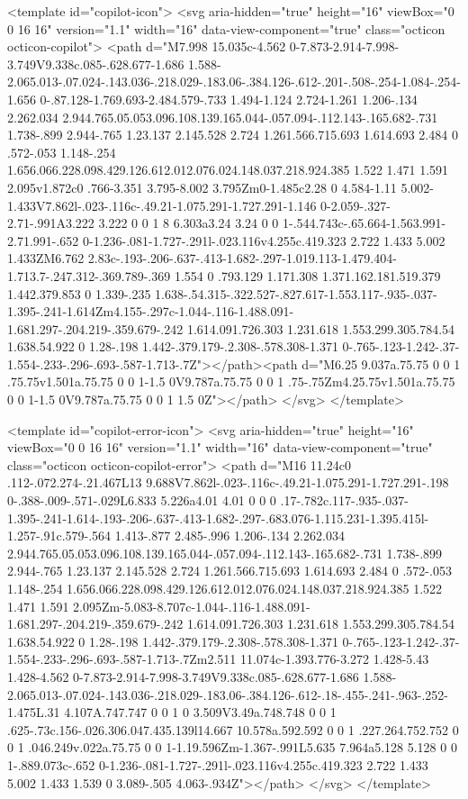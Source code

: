 <template id="copilot-icon">
  <svg aria-hidden="true" height="16" viewBox="0 0 16 16" version="1.1" width="16" data-view-component="true" class="octicon octicon-copilot">
    <path d="M7.998 15.035c-4.562 0-7.873-2.914-7.998-3.749V9.338c.085-.628.677-1.686 1.588-2.065.013-.07.024-.143.036-.218.029-.183.06-.384.126-.612-.201-.508-.254-1.084-.254-1.656 0-.87.128-1.769.693-2.484.579-.733 1.494-1.124 2.724-1.261 1.206-.134 2.262.034 2.944.765.05.053.096.108.139.165.044-.057.094-.112.143-.165.682-.731 1.738-.899 2.944-.765 1.23.137 2.145.528 2.724 1.261.566.715.693 1.614.693 2.484 0 .572-.053 1.148-.254 1.656.066.228.098.429.126.612.012.076.024.148.037.218.924.385 1.522 1.471 1.591 2.095v1.872c0 .766-3.351 3.795-8.002 3.795Zm0-1.485c2.28 0 4.584-1.11 5.002-1.433V7.862l-.023-.116c-.49.21-1.075.291-1.727.291-1.146 0-2.059-.327-2.71-.991A3.222 3.222 0 0 1 8 6.303a3.24 3.24 0 0 1-.544.743c-.65.664-1.563.991-2.71.991-.652 0-1.236-.081-1.727-.291l-.023.116v4.255c.419.323 2.722 1.433 5.002 1.433ZM6.762 2.83c-.193-.206-.637-.413-1.682-.297-1.019.113-1.479.404-1.713.7-.247.312-.369.789-.369 1.554 0 .793.129 1.171.308 1.371.162.181.519.379 1.442.379.853 0 1.339-.235 1.638-.54.315-.322.527-.827.617-1.553.117-.935-.037-1.395-.241-1.614Zm4.155-.297c-1.044-.116-1.488.091-1.681.297-.204.219-.359.679-.242 1.614.091.726.303 1.231.618 1.553.299.305.784.54 1.638.54.922 0 1.28-.198 1.442-.379.179-.2.308-.578.308-1.371 0-.765-.123-1.242-.37-1.554-.233-.296-.693-.587-1.713-.7Z"></path><path d="M6.25 9.037a.75.75 0 0 1 .75.75v1.501a.75.75 0 0 1-1.5 0V9.787a.75.75 0 0 1 .75-.75Zm4.25.75v1.501a.75.75 0 0 1-1.5 0V9.787a.75.75 0 0 1 1.5 0Z"></path>
</svg>
</template>

<template id="copilot-error-icon">
  <svg aria-hidden="true" height="16" viewBox="0 0 16 16" version="1.1" width="16" data-view-component="true" class="octicon octicon-copilot-error">
    <path d="M16 11.24c0 .112-.072.274-.21.467L13 9.688V7.862l-.023-.116c-.49.21-1.075.291-1.727.291-.198 0-.388-.009-.571-.029L6.833 5.226a4.01 4.01 0 0 0 .17-.782c.117-.935-.037-1.395-.241-1.614-.193-.206-.637-.413-1.682-.297-.683.076-1.115.231-1.395.415l-1.257-.91c.579-.564 1.413-.877 2.485-.996 1.206-.134 2.262.034 2.944.765.05.053.096.108.139.165.044-.057.094-.112.143-.165.682-.731 1.738-.899 2.944-.765 1.23.137 2.145.528 2.724 1.261.566.715.693 1.614.693 2.484 0 .572-.053 1.148-.254 1.656.066.228.098.429.126.612.012.076.024.148.037.218.924.385 1.522 1.471 1.591 2.095Zm-5.083-8.707c-1.044-.116-1.488.091-1.681.297-.204.219-.359.679-.242 1.614.091.726.303 1.231.618 1.553.299.305.784.54 1.638.54.922 0 1.28-.198 1.442-.379.179-.2.308-.578.308-1.371 0-.765-.123-1.242-.37-1.554-.233-.296-.693-.587-1.713-.7Zm2.511 11.074c-1.393.776-3.272 1.428-5.43 1.428-4.562 0-7.873-2.914-7.998-3.749V9.338c.085-.628.677-1.686 1.588-2.065.013-.07.024-.143.036-.218.029-.183.06-.384.126-.612-.18-.455-.241-.963-.252-1.475L.31 4.107A.747.747 0 0 1 0 3.509V3.49a.748.748 0 0 1 .625-.73c.156-.026.306.047.435.139l14.667 10.578a.592.592 0 0 1 .227.264.752.752 0 0 1 .046.249v.022a.75.75 0 0 1-1.19.596Zm-1.367-.991L5.635 7.964a5.128 5.128 0 0 1-.889.073c-.652 0-1.236-.081-1.727-.291l-.023.116v4.255c.419.323 2.722 1.433 5.002 1.433 1.539 0 3.089-.505 4.063-.934Z"></path>
</svg>
</template>

